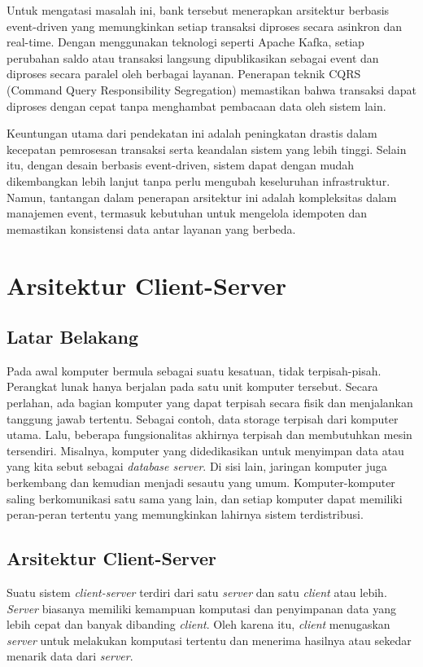 Untuk mengatasi masalah ini, bank tersebut menerapkan arsitektur berbasis event-driven yang memungkinkan setiap transaksi diproses secara asinkron dan real-time. Dengan menggunakan teknologi seperti Apache Kafka, setiap perubahan saldo atau transaksi langsung dipublikasikan sebagai event dan diproses secara paralel oleh berbagai layanan. Penerapan teknik CQRS (Command Query Responsibility Segregation) memastikan bahwa transaksi dapat diproses dengan cepat tanpa menghambat pembacaan data oleh sistem lain.

Keuntungan utama dari pendekatan ini adalah peningkatan drastis dalam kecepatan pemrosesan transaksi serta keandalan sistem yang lebih tinggi. Selain itu, dengan desain berbasis event-driven, sistem dapat dengan mudah dikembangkan lebih lanjut tanpa perlu mengubah keseluruhan infrastruktur. Namun, tantangan dalam penerapan arsitektur ini adalah kompleksitas dalam manajemen event, termasuk kebutuhan untuk mengelola idempoten dan memastikan konsistensi data antar layanan yang berbeda.


\section{Arsitektur Client-Server}

\subsection{Latar Belakang}
Pada awal komputer bermula sebagai suatu kesatuan, tidak terpisah-pisah. Perangkat lunak hanya berjalan pada satu unit komputer tersebut. Secara perlahan, ada bagian komputer yang dapat terpisah secara fisik dan menjalankan tanggung jawab tertentu. Sebagai contoh, data storage terpisah dari komputer utama. Lalu, beberapa fungsionalitas akhirnya terpisah dan membutuhkan mesin tersendiri. Misalnya, komputer yang didedikasikan untuk menyimpan data atau yang kita sebut sebagai \textit{database server}. Di sisi lain, jaringan komputer juga berkembang dan kemudian menjadi sesautu yang umum. Komputer-komputer saling berkomunikasi satu sama yang lain, dan setiap komputer dapat memiliki peran-peran tertentu yang memungkinkan lahirnya sistem terdistribusi.

\subsection{Arsitektur Client-Server}
Suatu sistem \textit{client-server} terdiri dari satu \textit{server} dan satu \textit{client} atau lebih. \textit{Server} biasanya memiliki kemampuan komputasi dan penyimpanan data yang lebih cepat dan banyak dibanding \textit{client}. Oleh karena itu, \textit{client} menugaskan \textit{server} untuk melakukan komputasi tertentu dan menerima hasilnya atau sekedar menarik data dari \textit{server}.

